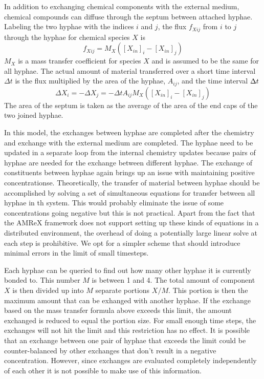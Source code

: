 \documentclass[12pt]{article}
\begin{document}
In addition to exchanging chemical components with the external medium, chemical compounds can
diffuse through the septum between attached hyphae. Labeling the two hyphae with the indices $i$
and $j$, the flux $f_{Xij}$ from $i$ to $j$ through the hyphae for chemical species $X$ is
\[
f_{Xij} = M_{X}([X_{in}]_i-[X_{in}]_j)
\]
$M_{X}$ is a mass transfer coefficient for species $X$ and is assumed to be the same for all
hyphae. The actual amount of material transferred over a short time interval $\Delta t$ is the
flux multiplied by the area of the hyphae, $A_{ij}$, and the time interval $\Delta t$
\[
\Delta X_i = -\Delta X_j = -\Delta t A_{ij} M_{X}([X_{in}]_i-[X_{in}]_j)
\]
The area of the septum is taken as the average of the area of the end caps of the two joined
hyphae.

In this model, the exchanges between hyphae are completed after the chemistry and exchange
with the external medium are completed. The hyphae need to be updated in a
separate loop from the internal chemistry updates because pairs of hyphae are
needed for the exchange between different hyphae. The exchange of constituents
between hyphae again brings up an issue with maintaining positive
concentrationse. Theoretically, the transfer of material between hyphae should
be accomplished by solving a set of simultaneous equations for transfer between all hyphae in th
system. This would probably eliminate the issue of some concentrations going
negative but this is not practical. Apart from the fact that the AMReX framework does not support
setting up these kinds of equations in a distributed environment, the overhead of doing a
potentially large linear solve at each step is prohibitive. We opt for a simpler scheme that
should introduce minimal errors in the limit of small timesteps.

Each hyphae can be queried to find out how many other hyphae it is currently bonded to. This
number $M$ is between 1 and 4. The total amount of component $X$ is then divided up into $M$
separate portions $X/M$. This portion is then the maximum amount that can be exhanged with
another hyphae. If the exchange based on the mass transfer formula above exceeds this limit,
the amount exchanged is reduced to equal the portion size. For small enough time steps, the
exchanges will not hit the limit and this restriction has no effect. It is possible that an
exchange between one pair of hyphae that exceeds the limit could be counter-balanced by other
exchanges that don't result in a negative concentration. However, since exchanges are evaluated
completely independently of each other it is not possible to make use of this information.
\end{document}
